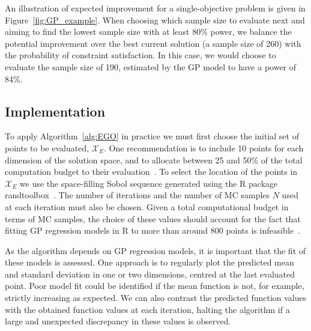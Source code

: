 \documentclass{article} %
\begin{document}
An illustration of expected improvement for a single-objective problem is given in Figure~\ref{fig:GP_example}. When choosing which sample size to evaluate next and aiming to find the lowest sample size with at least 80\% power, we balance the potential improvement over the best current solution (a sample size of 260) with the probability of constraint satisfaction. In this case, we would choose to evaluate the sample size of 190, estimated by the GP model to have a power of 84\%.


\subsection{Implementation}

To apply Algorithm~\ref{alg:EGO} in practice we must first choose the initial set of points to be evaluated, $\mathcal{X}_{E}$. One recommendation is to include 10 points for each dimension of the solution space, and to allocate between 25 and 50\% of the total computation budget to their evaluation~\cite{}. To select the location of the points in $\mathcal{X}_{E}$ we use the space-filling Sobol sequence generated using the R package randtoolbox~\cite{Dutang2015}. The number of iterations and the number of MC samples $N$ used at each iteration must also be chosen. Given a total computational budget in terms of MC samples, the choice of these values should account for the fact that fitting GP regression models in R to more than around 800 points is infeasible~\cite{Chevalier2014}. 

As the algorithm depends on GP regression models, it is important that the fit of these models is assessed. One approach is to regularly plot the predicted mean and standard deviation in one or two dimensions, centred at the last evaluated point. Poor model fit could be identified if the mean function is not, for example, strictly increasing as expected. We can also contrast the predicted function values with the obtained function values at each iteration, halting the algorithm if a large and unexpected discrepancy in these values is observed.
\end{document}
